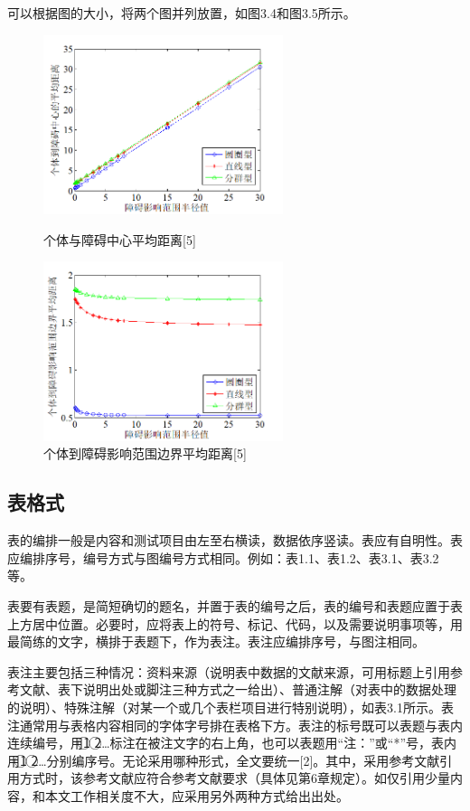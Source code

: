 可以根据图的大小，将两个图并列放置，如图3.4和图3.5所示。


\begin{figure} 
	\begin{minipage}[t]{0.45\linewidth} 
		\centering 
		\includegraphics[width=7cm]{chapters/3.4} 
		\caption{个体与障碍中心平均距离[5]} 
		\label{fig:side:a} 
	\end{minipage}%
	\begin{minipage}[t]{0.6\linewidth} 
		\centering 
		\includegraphics[width=7cm]{chapters/3.5} 
		\caption{个体到障碍影响范围边界平均距离[5]} 
		\label{fig:side:b} 
	\end{minipage} 
\end{figure}


\subsection{表格式}
表的编排一般是内容和测试项目由左至右横读，数据依序竖读。表应有自明性。表应编排序号，编号方式与图编号方式相同。例如：表1.1、表1.2、表3.1、表3.2等。

表要有表题，是简短确切的题名，并置于表的编号之后，表的编号和表题应置于表上方居中位置。必要时，应将表上的符号、标记、代码，以及需要说明事项等，用最简练的文字，横排于表题下，作为表注。表注应编排序号，与图注相同。

表注主要包括三种情况：资料来源（说明表中数据的文献来源，可用标题上引用参考文献、表下说明出处或脚注三种方式之一给出）、普通注解（对表中的数据处理的说明）、特殊注解（对某一个或几个表栏项目进行特别说明），如表3.1所示。表注通常用与表格内容相同的字体字号排在表格下方。表注的标号既可以表题与表内连续编号，用\textcircled{1} \textcircled{2}…标注在被注文字的右上角，也可以表题用“注：”或“*”号，表内用\textcircled{1} \textcircled{2}…分别编序号。无论采用哪种形式，全文要统一[2]。其中，采用参考文献引用方式时，该参考文献应符合参考文献要求（具体见第6章规定）。如仅引用少量内容，和本文工作相关度不大，应采用另外两种方式给出出处。

